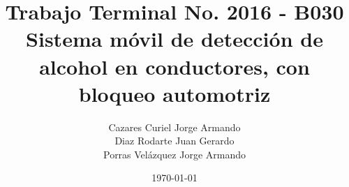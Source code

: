 \title{Trabajo Terminal No. 2016 - B030\\Sistema móvil de detección de alcohol en conductores, con bloqueo automotriz}
\author{Cazares Curiel Jorge Armando\\Diaz Rodarte Juan Gerardo\\Porras Velázquez Jorge Armando}
\date{\today}
\maketitle